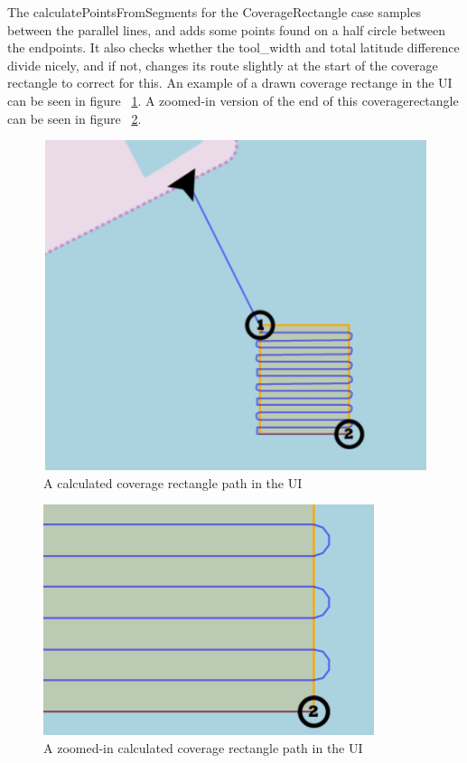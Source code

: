 The calculatePointsFromSegments for the CoverageRectangle case samples between the parallel lines, and adds some points found on a half circle between the endpoints. It also checks whether the tool_width and total latitude difference divide nicely, and if not, changes its route slightly at the start of the coverage rectangle to correct for this. An example of a drawn coverage rectange in the UI can be seen in figure ~\ref{fig:coverage_rectangle_path}. A zoomed-in version of the end of this coveragerectangle can be seen in figure ~\ref{fig:coverage_rectangle_path_zoom}.

\begin{figure}[H]
\centering
\includegraphics[width=0.9\linewidth]{Images/Implementation/Coverage_rectangle_on_map}
\caption{A calculated coverage rectangle path in the UI}
\label{fig:coverage_rectangle_path}
\end{figure}

\begin{figure}[H]
\centering
\includegraphics[width=0.9\linewidth]{Images/Implementation/Coverage_rectangle_on_map_zoom}
\caption{A zoomed-in calculated coverage rectangle path in the UI}
\label{fig:coverage_rectangle_path_zoom}
\end{figure}

